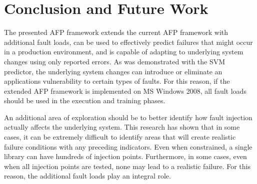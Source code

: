 \section{Conclusion and Future Work} \label{chapter5}
The presented \ac{AFP} framework extends the current \ac{AFP} framework with
additional fault loads, can be used to effectively predict failures that might
occur in a production environment, and is capable of adapting to underlying
system changes using only reported errors.  As was demonstrated with the
\ac{SVM} predictor, the underlying system changes can introduce or eliminate an
applications vulnerability to certain types of faults.  For this reason, if the
extended \ac{AFP} framework is implemented on \ac{MS} Windows 2008, all fault
loads should be used in the execution and training phases.

An additional area of exploration should be to better identify how fault
injection actually affects the underlying system.  This research has shown that
in some cases, it can be extremely difficult to identify areas that will create
realistic failure conditions with any preceding indicators.  Even when
constrained, a single library can have hundreds of injection points.
Furthermore, in some cases, even when all injection points are tested, none may
lead to a realistic failure.  For this reason, the additional fault loads play
an integral role.
